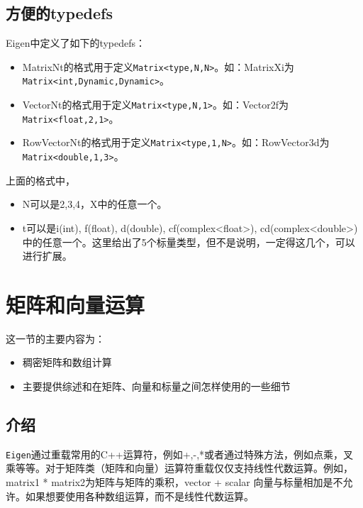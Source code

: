 \subsection{方便的typedefs}
Eigen中定义了如下的typedefs：
\begin{itemize}
\item MatrixNt的格式用于定义\verb|Matrix<type,N,N>|。如：MatrixXi为\verb|Matrix<int,Dynamic,Dynamic>|。
\item VectorNt的格式用于定义\verb|Matrix<type,N,1>|。如：Vector2f为\verb|Matrix<float,2,1>|。
\item RowVectorNt的格式用于定义\verb|Matrix<type,1,N>|。如：RowVector3d为\verb|Matrix<double,1,3>|。
\end{itemize}

上面的格式中，

\begin{itemize}
\item N可以是2,3,4，X中的任意一个。
\item t可以是i(int), f(float), d(double), cf(complex<float>), cd(complex<double>)中的任意一个。这里给出了5个标量类型，但不是说明，一定得这几个，可以进行扩展。
\end{itemize} 

\section{矩阵和向量运算}
这一节的主要内容为：
\begin{itemize}
\item 稠密矩阵和数组计算
\item 主要提供综述和在矩阵、向量和标量之间怎样使用的一些细节
\end{itemize}

\subsection{介绍}
\verb|Eigen|通过重载常用的C++运算符，例如+,-,*或者通过特殊方法，例如点乘，叉乘等等。对于矩阵类（矩阵和向量）运算符重载仅仅支持线性代数运算。例如，matrix1 * matrix2为矩阵与矩阵的乘积，vector + scalar 向量与标量相加是不允许。如果想要使用各种数组运算，而不是线性代数运算。

